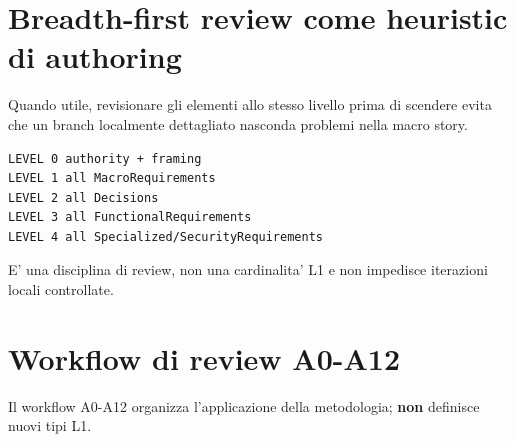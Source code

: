 \documentclass[11pt,a4paper]{article}
\begin{document}
\section{Breadth-first review come heuristic di authoring}
\workingtag

Quando utile, revisionare gli elementi allo stesso livello prima di scendere evita che un branch localmente dettagliato nasconda problemi nella macro story.

\begin{lstlisting}
LEVEL 0 authority + framing
LEVEL 1 all MacroRequirements
LEVEL 2 all Decisions
LEVEL 3 all FunctionalRequirements
LEVEL 4 all Specialized/SecurityRequirements
\end{lstlisting}

E' una disciplina di review, non una cardinalita' L1 e non impedisce iterazioni locali controllate.

\section{Workflow di review A0-A12}

Il workflow A0-A12 organizza l'applicazione della metodologia; \textbf{non} definisce nuovi tipi L1.
\end{document}
